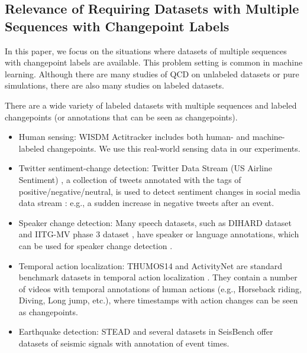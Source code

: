 \documentclass{article}
\theoremstyle{plain}
\theoremstyle{definition}
\theoremstyle{remark}
\begin{document}
\subsection{Relevance of Requiring Datasets with Multiple Sequences with Changepoint Labels} \label{app:RelevanceOfRequiringDatasetsWith}

In this paper, we focus on the situations where datasets of multiple sequences with changepoint labels are available.
This problem setting is common in machine learning.
Although there are many studies of QCD on unlabeled datasets or pure simulations, there are also many studies on labeled datasets.

There are a wide variety of labeled datasets with multiple sequences and labeled changepoints (or annotations that can be seen as changepoints).
\begin{itemize}
    \item Human sensing: WISDM Actitracker \citep{kwapisz2011activity_WISDM_Actitracker_dataset} includes both human- and machine-labeled changepoints. We use this real-world sensing data in our experiments.
    \item Twitter sentiment-change detection: Twitter Data Stream (US Airline Sentiment) \citep{makone2016twitterusairline_7}, a collection of tweets annotated with the tags of positive/negative/neutral, is used to detect sentiment changes in social media data stream \citep{bouchikhi2019kernel_6}: e.g., a sudden increase in negative tweets after an event.
    \item Speaker change detection: Many speech datasets, such as DIHARD dataset \citep{ryant2018first_11} and IITG-MV phase 3 dataset \citep{haris2012multivariability_12}, have speaker or language annotations, which can be used for speaker change detection \citep{mishra2024spoken_10}.
    \item Temporal action localization: THUMOS14 \cite{THUMOS14} and ActivityNet \citep{activitynet} are standard benchmark datasets in temporal action localization \citep{wang2023temporal}. They contain a number of videos with temporal annotations of human actions (e.g., Horseback riding, Diving, Long jump, etc.), where timestamps with action changes can be seen as changepoints.
    \item Earthquake detection: STEAD \citep{mousavi2019stanford} and several datasets in SeisBench \citep{woollam2022seisbench} offer datasets of seismic signals with annotation of event times.
\end{itemize}
\end{document}
